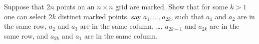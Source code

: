 \documentclass{article}
\begin{document}
	\setlength{\parindent}{0pt}
	Suppose that $2n$ points on an $n\times n$ grid are marked. Show that for some $k>1$ one can select $2k$ distinct marked points, say $a_1,\dots,a_{2k}$, such that $a_1$ and $a_2$ are in the same row, $a_2$ and $a_3$ are in the same column, \dots, $a_{2k-1}$ and $a_{2k}$ are in the same row, and $a_{2k}$ and $a_1$ are in the same column.
\end{document}
